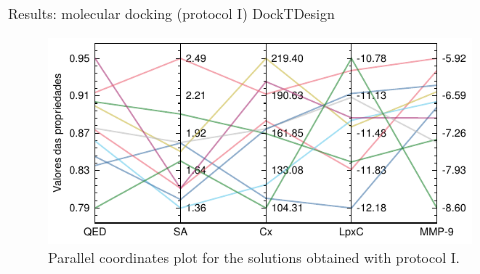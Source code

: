 \documentclass[aspectratio=169,xcolor=dvipsnames]{beamer}
\begin{document}



\begin{frame}{Results: molecular docking (protocol I) \hfill {\footnotesize \alert{DockTDesign}}}
    \begin{figure}
        \centering
        \includegraphics[width=.8\textwidth]{imgs/results/protocol1-parallel-coords}
        \caption{Parallel coordinates plot for the solutions obtained with protocol I.}
    \end{figure}
\end{frame}


\end{document}
